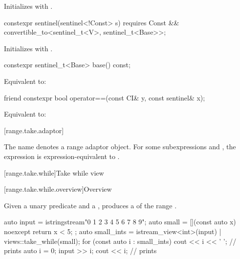 \begin{itemdescr}
\pnum
\effects Initializes  with .
\end{itemdescr}

%
\begin{itemdecl}
constexpr sentinel(sentinel<!Const> s)
  requires Const && convertible_to<sentinel_t<V>, sentinel_t<Base>>;
\end{itemdecl}

\begin{itemdescr}
\pnum
\effects Initializes  with .
\end{itemdescr}

\begin{itemdecl}
constexpr sentinel_t<Base> base() const;
\end{itemdecl}

\begin{itemdescr}
\pnum
\effects Equivalent to: 
\end{itemdescr}

\begin{itemdecl}
friend constexpr bool operator==(const CI& y, const sentinel& x);
\end{itemdecl}

\begin{itemdescr}
\pnum
\effects Equivalent to:
\end{itemdescr}

[range.take.adaptor]{}

\pnum
The name  denotes a
range adaptor object.
For some subexpressions  and , the expression
 is expression-equivalent to
.

[range.take.while]{Take while view}

[range.take.while.overview]{Overview}

\pnum
Given a unary predicate  and a  ,
 produces a 
of the range .

\pnum
\begin{example}
\begin{codeblock}
auto input = istringstream{"0 1 2 3 4 5 6 7 8 9"};
auto small = [](const auto x) noexcept { return x < 5; };
auto small_ints = istream_view<int>(input) | views::take_while(small);
for (const auto i : small_ints) {
  cout << i << ' ';                             // prints 
}
auto i = 0;
input >> i;
cout << i;                                      // prints 
\end{codeblock}
\end{example}

